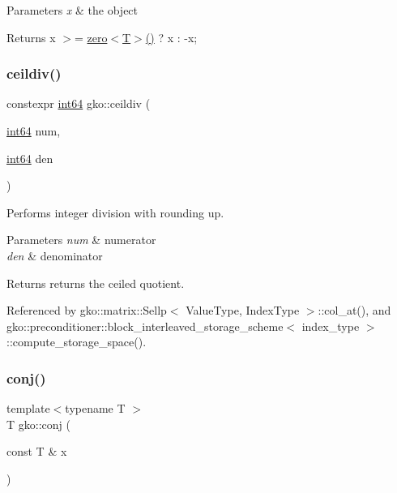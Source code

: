 \begin{DoxyParams}{Parameters}
{\em x} & the object\\
\hline
\end{DoxyParams}
\begin{DoxyReturn}{Returns}
x $>$= \hyperlink{namespacegko_a70dbe01ff95c7b953d3d737424c6feb5}{zero$<$\+T$>$()} ? x \+: -\/x; 
\end{DoxyReturn}
\mbox{\label{namespacegko_a93065a86872e6511b701b73b75823483}} 
\subsubsection{\texorpdfstring{ceildiv()}{ceildiv()}}
{\footnotesize\ttfamily constexpr \hyperlink{namespacegko_a6c57dbf3168b1ecad3ea133aaf2efbc1}{int64} gko\+::ceildiv (\begin{DoxyParamCaption}\item[{\hyperlink{namespacegko_a6c57dbf3168b1ecad3ea133aaf2efbc1}{int64}}]{num,  }\item[{\hyperlink{namespacegko_a6c57dbf3168b1ecad3ea133aaf2efbc1}{int64}}]{den }\end{DoxyParamCaption})\hspace{0.3cm}{\ttfamily [inline]}}



Performs integer division with rounding up. 


\begin{DoxyParams}{Parameters}
{\em num} & numerator \\
\hline
{\em den} & denominator\\
\hline
\end{DoxyParams}
\begin{DoxyReturn}{Returns}
returns the ceiled quotient. 
\end{DoxyReturn}


Referenced by gko\+::matrix\+::\+Sellp$<$ Value\+Type, Index\+Type $>$\+::col\+\_\+at(), and gko\+::preconditioner\+::block\+\_\+interleaved\+\_\+storage\+\_\+scheme$<$ index\+\_\+type $>$\+::compute\+\_\+storage\+\_\+space().

\mbox{\label{namespacegko_acdaec5c4f959a948a6d0f3e99a57c7ea}} 
\subsubsection{\texorpdfstring{conj()}{conj()}}
{\footnotesize\ttfamily template$<$typename T $>$ \\
T gko\+::conj (\begin{DoxyParamCaption}\item[{const T \&}]{x }\end{DoxyParamCaption})\hspace{0.3cm}{\ttfamily [inline]}}



